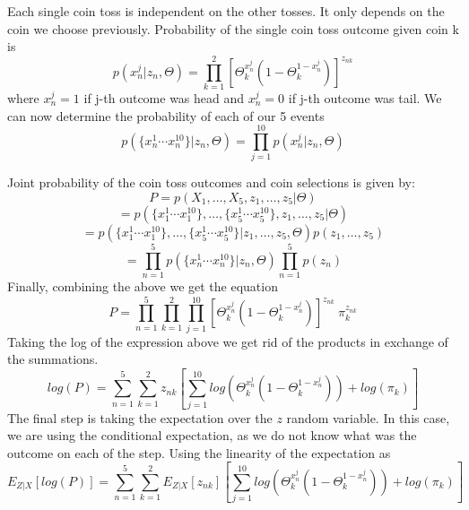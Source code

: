 \documentclass[11pt]{article}
\begin{document}
Each single coin toss is independent on the other tosses. It only depends on the coin we choose previously. Probability of the single coin toss outcome given coin k is
\begin{equation}
p(x_n^j|{z_n},\Theta)=\prod_{k=1}^{2}[\Theta_k^{x_n^j}(1-\Theta_k^{1-x_n^j})]^{z_{nk}}
\end{equation}
where $x_n^j=1$ if j-th outcome was head and $x_n^j=0$ if j-th outcome was tail. We can now determine the probability of each of our 5 events
\begin{equation}
p(\{x^1_n\cdots x^{10}_n\}|z_n,\Theta)=\prod_{j=1}^{10}p(x_n^j|{z_n},\Theta)
\end{equation}

Joint probability of the coin toss outcomes and coin selections is given by:
\begin{equation}
P = p(X_1,\dots, X_5,{z_1,\dots,z_5}|\Theta) 
\end{equation}
\begin{equation}
= p(\{x^1_1\cdots x^{10}_1\},\dots,\{x^1_5\cdots x^{10}_5\}, z_1,\dots,z_5|\Theta)
\end{equation}
\begin{equation}
= p(\{x^1_1\cdots x^{10}_1\},\dots,\{x^1_5\cdots x^{10}_5\}| z_1,\dots,z_5,\Theta)p(z_1,\dots,z_5)
\end{equation}
\begin{equation}
=\prod_{n=1}^{5}p(\{x^1_n\cdots x^{10}_n\}|z_n,\Theta) \prod_{n=1}^{5}p({z_n})
\end{equation}
Finally, combining the above we get the equation
\begin{equation}
P = 
\prod_{n=1}^{5}\prod_{k=1}^{2}\prod_{j=1}^{10}[\Theta_k^{x_n^j}(1-\Theta_k^{1-x_n^j})]^{z_{nk}}\:\pi_{k}^{z_{nk}}
\end{equation}
Taking the log of the expression above we get rid of the products in exchange of the summations.
\begin{equation}
log(P) = 
\sum_{n=1}^{5}\sum_{k=1}^{2}z_{nk}[\sum_{j=1}^{10}log(\Theta_k^{x_n^j}(1-\Theta_k^{1-x_n^j}))+log(\pi_{k})]
\end{equation}
The final step is taking the expectation over the $z$ random variable. In this case, we are using the conditional expectation, as we do not
know what was the outcome on each of the step. Using the linearity of the expectation as
\begin{equation}
E_{Z|X}[log(P)] = 
\sum_{n=1}^{5}\sum_{k=1}^{2}E_{Z|X}[z_{nk}][\sum_{j=1}^{10}log(\Theta_k^{x_n^j}(1-\Theta_k^{1-x_n^j}))+log(\pi_{k})]
\end{equation}
\end{document}
